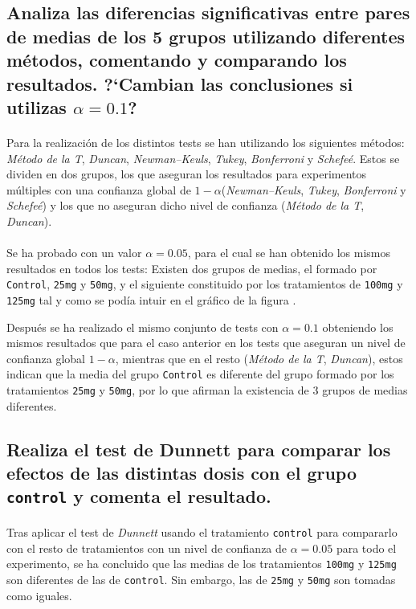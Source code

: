 \documentclass{article}
\begin{document}
    \subsection{Analiza las diferencias significativas entre pares de medias de los 5 grupos utilizando diferentes métodos, comentando y comparando los resultados. ?`Cambian las conclusiones si utilizas $\alpha = 0.1$?}

      \paragraph{}
      Para la realización de los distintos tests se han utilizando los siguientes métodos: \emph{Método de la T}, \emph{Duncan}, \emph{Newman–Keuls}, \emph{Tukey}, \emph{Bonferroni} y \emph{Schefeé}. Estos se dividen en dos grupos, los que aseguran los resultados para experimentos múltiples con una confianza global de $1-\alpha$(\emph{Newman–Keuls}, \emph{Tukey}, \emph{Bonferroni} y \emph{Schefeé}) y los que no aseguran dicho nivel de confianza (\emph{Método de la T}, \emph{Duncan}).

      \paragraph{}
      Se ha probado con un valor $\alpha = 0.05$, para el cual se han obtenido los mismos resultados en todos los tests: Existen dos grupos de medias, el formado por \texttt{Control}, \texttt{25mg} y \texttt{50mg}, y el siguiente constituido por los tratamientos de \texttt{100mg} y \texttt{125mg} tal y como se podía intuir en el gráfico de la figura \label{fig:figura_1}.

      Después se ha realizado el mismo conjunto de tests con $\alpha = 0.1$ obteniendo los mismos resultados que para el caso anterior en los tests que aseguran un nivel de confianza global $1-\alpha$, mientras que en el resto (\emph{Método de la T}, \emph{Duncan}), estos indican que la media del grupo \texttt{Control} es diferente del grupo formado por los tratamientos \texttt{25mg} y \texttt{50mg}, por lo que afirman la existencia de 3 grupos de medias diferentes.

    \subsection{Realiza el test de Dunnett para comparar los efectos de las distintas dosis con el grupo \texttt{control} y comenta el resultado.}

      \paragraph{}
      Tras aplicar el test de \emph{Dunnett} usando el tratamiento \texttt{control} para compararlo con el resto de tratamientos con un nivel de confianza de $\alpha=0.05$ para todo el experimento, se ha concluido que las medias de los tratamientos \texttt{100mg} y \texttt{125mg} son diferentes de las de \texttt{control}. Sin embargo, las de \texttt{25mg} y \texttt{50mg} son tomadas como iguales.
\end{document}
